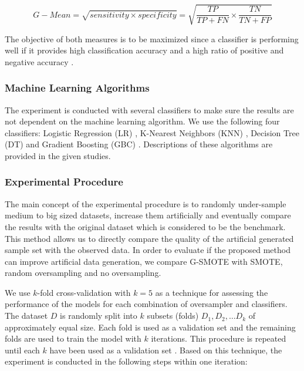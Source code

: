 \documentclass[parskip=full]{scrartcl}
\begin{document}
\[G-Mean = \sqrt{sensitivity \times specificity} = \sqrt{\dfrac{TP}{TP + FN} 
\times \dfrac{TN}{TN + FP}}\]

The objective of both measures is to be maximized since a classifier is 
performing well if it provides high classification accuracy and a high ratio of 
positive and negative accuracy \cite{Han.2012}. 

\subsubsection{Machine Learning Algorithms}

The experiment is conducted with several classifiers to make sure the results 
are not dependent on the machine learning algorithm. We use the following four 
classifiers: Logistic Regression (LR) \cite{McCullagh.2019}, K-Nearest 
Neighbors (KNN) \cite{Cover.1967}, Decision Tree (DT) \cite{Salzberg.1994} and 
Gradient Boosting (GBC) \cite{Friedman.2001}. Descriptions of these algorithms 
are provided in the given studies.

\subsubsection{Experimental Procedure}

The main concept of the experimental procedure is to randomly under-sample 
medium to big sized datasets, increase them artificially and eventually compare 
the results with the original dataset which is considered to be the benchmark. 
This method allows us to directly compare the quality of the artificial 
generated sample set with the observed data. In order to evaluate if the 
proposed method can improve artificial data generation, we compare G-SMOTE with 
SMOTE, random oversampling and no oversampling. 

We use $\mathit{k}$-fold cross-validation with $\mathit{k = 5}$ as a technique 
for assessing the performance of the models for each combination of oversampler 
and classifiers. The dataset $\mathit{D}$ is randomly split into $\mathit{k}$ 
subsets (folds) $\mathit{D_1, D_2, … D_k}$ of approximately equal size. Each 
fold is used as a validation set and the remaining folds are used to train the 
model with $\mathit{k}$ iterations. This procedure is repeated until each 
$\mathit{k}$ have been used as a validation set \cite{Han.2012}. Based on this 
technique, the experiment is conducted in the following steps within one 
iteration:
\end{document}
